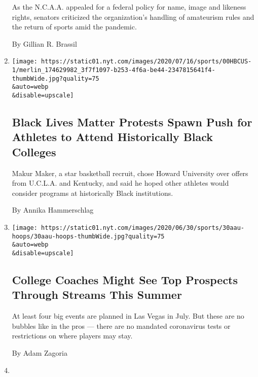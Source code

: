 \begin{enumerate}
  As the N.C.A.A. appealed for a federal policy for name, image and
  likeness rights, senators criticized the organization's handling of
  amateurism rules and the return of sports amid the pandemic.

  By Gillian R. Brassil
\item
  \href{/2020/07/22/sports/ncaabasketball/black-lives-matter-hbcus-college-athletes.html}{}

  \texttt{[image: https://static01.nyt.com/images/2020/07/16/sports/00HBCUS-1/merlin\_174629982\_3f7f1097-b253-4f6a-be44-2347815641f4-thumbWide.jpg?quality=75\\\&auto=webp\\\&disable=upscale]}

  \hypertarget{black-lives-matter-protests-spawn-push-for-athletes-to-attend-historically-black-colleges}{%
  \subsection{Black Lives Matter Protests Spawn Push for Athletes to
  Attend Historically Black
  Colleges}\label{black-lives-matter-protests-spawn-push-for-athletes-to-attend-historically-black-colleges}}

  Makur Maker, a star basketball recruit, chose Howard University over
  offers from U.C.L.A. and Kentucky, and said he hoped other athletes
  would consider programs at historically Black institutions.

  By Annika Hammerschlag
\item
  \href{/2020/06/30/sports/ncaabasketball/coronavirus-aau-basketball-las-vegas.html}{}

  \texttt{[image: https://static01.nyt.com/images/2020/06/30/sports/30aau-hoops/30aau-hoops-thumbWide.jpg?quality=75\\\&auto=webp\\\&disable=upscale]}

  \hypertarget{college-coaches-might-see-top-prospects-through-streams-this-summer}{%
  \subsection{College Coaches Might See Top Prospects Through Streams
  This
  Summer}\label{college-coaches-might-see-top-prospects-through-streams-this-summer}}

  At least four big events are planned in Las Vegas in July. But these
  are no bubbles like in the pros --- there are no mandated coronavirus
  tests or restrictions on where players may stay.

  By Adam Zagoria
\item
  \href{/2020/06/23/sports/ncaabasketball/cade-cunningham-oklahoma-state.html}{}


\end{enumerate}
